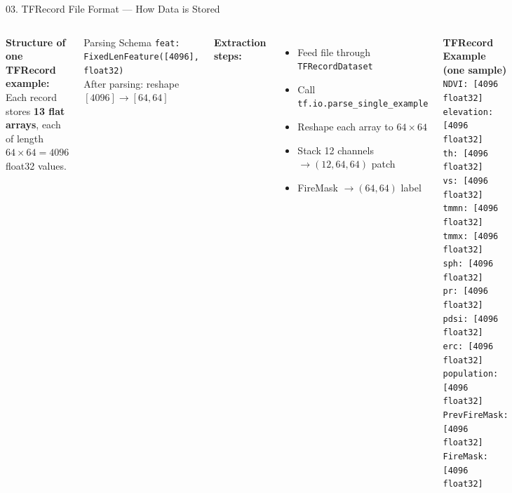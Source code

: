 ﻿\documentclass[aspectratio=169,t]{beamer}
\begin{document}
\begin{frame}{03. TFRecord File Format --- How Data is Stored}
\begin{columns}[t]
\textcolor{accent}{\textbf{Structure of one TFRecord example:}}\\[0.2cm]
Each record stores \textbf{13 flat arrays}, each of length $64 \times 64 = 4096$ float32 values.

\vspace{0.2cm}
\begin{block}{Parsing Schema}
\small\texttt{feat: FixedLenFeature([4096], float32)}\\[0.1cm]
After parsing: reshape $[4096] \rightarrow [64,64]$
\end{block}
\vspace{0.2cm}
\textcolor{accentgreen}{\textbf{Extraction steps:}}
\begin{itemize}
  \item Feed file through \texttt{TFRecordDataset}
  \item Call \texttt{tf.io.parse\_single\_example}
  \item Reshape each array to $64 \times 64$
  \item Stack 12 channels $\rightarrow (12,64,64)$ patch
  \item FireMask $\rightarrow (64,64)$ label
\end{itemize}
\small
\colorbox{blockbg}{\begin{minipage}{0.95\linewidth}
\textcolor{accent}{\textbf{TFRecord Example (one sample)}}\\[4pt]
\texttt{NDVI:         [4096 float32]}\\
\texttt{elevation:    [4096 float32]}\\
\texttt{th:           [4096 float32]}\\
\texttt{vs:           [4096 float32]}\\
\texttt{tmmn:         [4096 float32]}\\
\texttt{tmmx:         [4096 float32]}\\
\texttt{sph:          [4096 float32]}\\
\texttt{pr:           [4096 float32]}\\
\texttt{pdsi:         [4096 float32]}\\
\texttt{erc:          [4096 float32]}\\
\texttt{population:   [4096 float32]}\\
\texttt{PrevFireMask: [4096 float32]}\\
\textcolor{firered}{\texttt{FireMask:     [4096 float32]}}
\end{minipage}}
\end{columns}
\end{frame}
\end{document}

